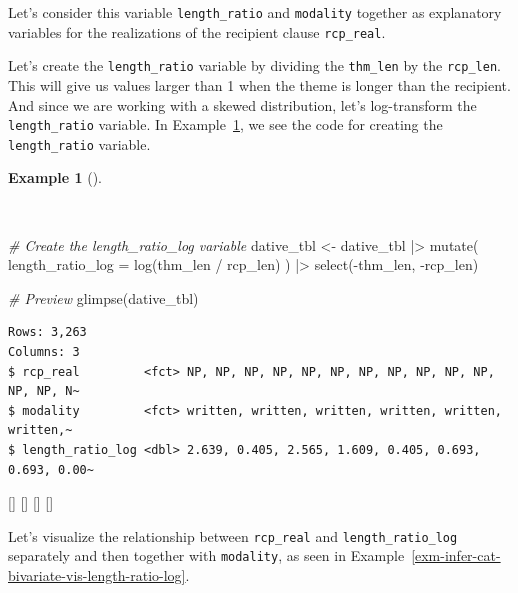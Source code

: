 \documentclass[
  letterpaper,
  krantz1]{latex/krantz-mod}
\newenvironment{Shaded}{\begin{snugshade}}{\end{snugshade}}
\newcommand{\AttributeTok}[1]{\textcolor[rgb]{0.00,0.00,0.00}{#1}}
\newcommand{\CommentTok}[1]{\textcolor[rgb]{0.00,0.00,0.00}{\textit{#1}}}
\newcommand{\FunctionTok}[1]{\textcolor[rgb]{0.00,0.00,0.00}{#1}}
\newcommand{\NormalTok}[1]{\textcolor[rgb]{0.00,0.00,0.00}{#1}}
\newcommand{\OtherTok}[1]{\textcolor[rgb]{0.00,0.00,0.00}{#1}}
\newcommand{\SpecialCharTok}[1]{\textcolor[rgb]{0.00,0.00,0.00}{#1}}
\newcommand{\cindex}[1]{%
  \StrSubstitute{#1}{_}{\_}[\temp]%
  \index{\temp}%
}
\theoremstyle{definition}
\theoremstyle{definition}
\newtheorem{example}{Example}[chapter]
\theoremstyle{remark}
\begin{document}
Let's consider this variable \texttt{length\_ratio} and
\texttt{modality} together as explanatory variables for the realizations
of the recipient clause \texttt{rcp\_real}.

Let's create the \texttt{length\_ratio} variable by dividing the
\texttt{thm\_len} by the \texttt{rcp\_len}. This will give us values
larger than 1 when the theme is longer than the recipient. And since we
are working with a skewed distribution, let's
log-transform the \texttt{length\_ratio}
variable. In Example~\ref{exm-infer-cat-create-length-ratio}, we see the
code for creating the \texttt{length\_ratio} variable.

\begin{example}[]\protect\hypertarget{exm-infer-cat-create-length-ratio}{}\label{exm-infer-cat-create-length-ratio}

~

\begin{Shaded}
\begin{Highlighting}[numbers=left,,]
\CommentTok{\# Create the \textasciigrave{}length\_ratio\_log\textasciigrave{} variable}
\NormalTok{dative\_tbl }\OtherTok{\textless{}{-}}
\NormalTok{  dative\_tbl }\SpecialCharTok{|\textgreater{}}
  \FunctionTok{mutate}\NormalTok{(}
    \AttributeTok{length\_ratio\_log =} \FunctionTok{log}\NormalTok{(thm\_len }\SpecialCharTok{/}\NormalTok{ rcp\_len)}
\NormalTok{  ) }\SpecialCharTok{|\textgreater{}}
  \FunctionTok{select}\NormalTok{(}\SpecialCharTok{{-}}\NormalTok{thm\_len, }\SpecialCharTok{{-}}\NormalTok{rcp\_len)}

\CommentTok{\# Preview}
\FunctionTok{glimpse}\NormalTok{(dative\_tbl)}
\end{Highlighting}
\end{Shaded}

\begin{verbatim}
Rows: 3,263
Columns: 3
$ rcp_real         <fct> NP, NP, NP, NP, NP, NP, NP, NP, NP, NP, NP, NP, NP, N~
$ modality         <fct> written, written, written, written, written, written,~
$ length_ratio_log <dbl> 2.639, 0.405, 2.565, 1.609, 0.405, 0.693, 0.693, 0.00~
\end{verbatim}

\cindex{mutate()}\cindex{select()}\cindex{glimpse()}\cindex{log()}

\end{example}

Let's visualize the relationship between \texttt{rcp\_real} and
\texttt{length\_ratio\_log} separately and then together with
\texttt{modality}, as seen in
Example~\ref{exm-infer-cat-bivariate-vis-length-ratio-log}.
\end{document}
